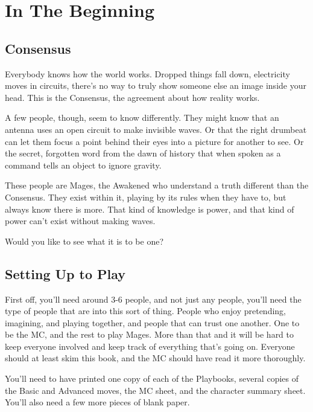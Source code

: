 \documentclass[
]{article}
\date{}
\begin{document}
\hypertarget{in-the-beginning}{%
\section{In The Beginning}\label{in-the-beginning}}

\hypertarget{consensus}{%
\subsection{Consensus}\label{consensus}}

Everybody knows how the world works. Dropped things fall down,
electricity moves in circuits, there's no way to truly show someone else
an image inside your head. This is the Consensus, the agreement about
how reality works.

A few people, though, seem to know differently. They might know that an
antenna uses an open circuit to make invisible waves. Or that the right
drumbeat can let them focus a point behind their eyes into a picture for
another to see. Or the secret, forgotten word from the dawn of history
that when spoken as a command tells an object to ignore gravity.

These people are Mages, the Awakened who understand a truth different
than the Consensus. They exist within it, playing by its rules when they
have to, but always know there is more. That kind of knowledge is power,
and that kind of power can't exist without making waves.

Would you like to see what it is to be one?

\hypertarget{setting-up-to-play}{%
\subsection{Setting Up to Play}\label{setting-up-to-play}}

First off, you'll need around 3-6 people, and not just any people,
you'll need the type of people that are into this sort of thing. People
who enjoy pretending, imagining, and playing together, and people that
can trust one another. One to be the MC, and the rest to play Mages.
More than that and it will be hard to keep everyone involved and keep
track of everything that's going on. Everyone should at least skim this
book, and the MC should have read it more thoroughly.

You'll need to have printed one copy of each of the Playbooks, several
copies of the Basic and Advanced moves, the MC sheet, and the character
summary sheet. You'll also need a few more pieces of blank paper.
\end{document}
